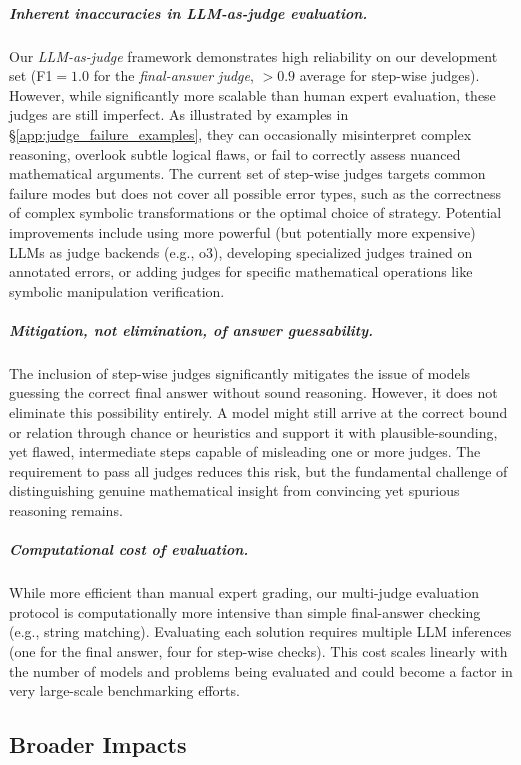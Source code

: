 \subparagraph{Inherent inaccuracies in LLM-as-judge evaluation.} Our \textit{LLM-as-judge} framework demonstrates high reliability on our development set (F1$=1.0$ for the \textit{final-answer judge}, $>0.9$ average for step-wise judges). However, while significantly more scalable than human expert evaluation, these judges are still imperfect. As illustrated by examples in \S\ref{app:judge_failure_examples}, they can occasionally misinterpret complex reasoning, overlook subtle logical flaws, or fail to correctly assess nuanced mathematical arguments. The current set of step-wise judges targets common failure modes but does not cover all possible error types, such as the correctness of complex symbolic transformations or the optimal choice of strategy. Potential improvements include using more powerful (but potentially more expensive) LLMs as judge backends (e.g., o3), developing specialized judges trained on annotated errors, or adding judges for specific mathematical operations like symbolic manipulation verification.

\subparagraph{Mitigation, not elimination, of answer guessability.} 
The inclusion of step-wise judges significantly mitigates the issue of models guessing the correct final answer without sound reasoning. However, it does not eliminate this possibility entirely. A model might still arrive at the correct bound or relation through chance or heuristics and support it with plausible-sounding, yet flawed, intermediate steps capable of misleading one or more judges. The requirement to pass all judges reduces this risk, but the fundamental challenge of distinguishing genuine mathematical insight from convincing yet spurious reasoning remains.

\subparagraph{Computational cost of evaluation.} While more efficient than manual expert grading, our multi-judge evaluation protocol is computationally more intensive than simple final-answer checking (e.g., string matching). Evaluating each solution requires multiple LLM inferences (one for the final answer, four for step-wise checks). This cost scales linearly with the number of models and problems being evaluated and could become a factor in very large-scale benchmarking efforts.


\subsection{Broader Impacts}
\label{app:impacts}

